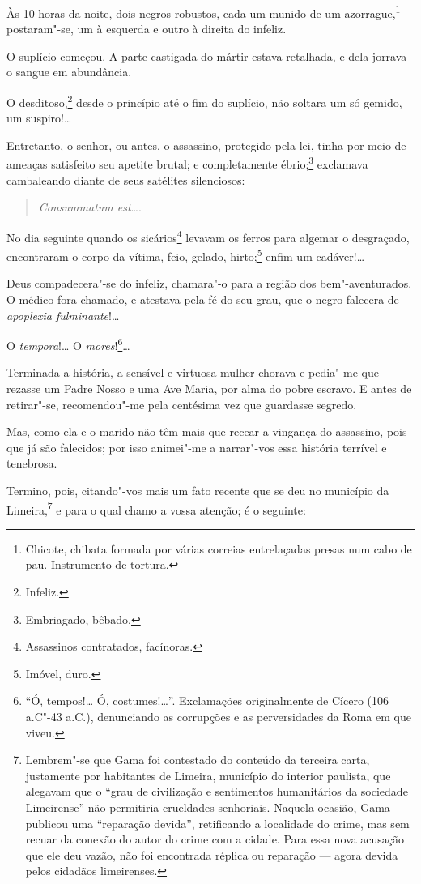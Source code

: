 Às 10 horas da noite, dois negros robustos, cada um munido de um
azorrague,\footnote{Chicote, chibata formada por várias correias
  entrelaçadas presas num cabo de pau. Instrumento de tortura.}
postaram"-se, um à esquerda e outro à direita do infeliz.

O suplício começou. A parte castigada do mártir estava retalhada, e dela
jorrava o sangue em abundância.

O desditoso,\footnote{Infeliz.} desde o princípio até o fim do
suplício, não soltara um só gemido, um suspiro!\ldots{}

Entretanto, o senhor, ou antes, o assassino, protegido pela lei, tinha
por meio de ameaças satisfeito seu apetite brutal; e completamente
ébrio;\footnote{Embriagado, bêbado.} exclamava cambaleando diante de
seus satélites silenciosos:

\begin{quote}
\emph{Consummatum est}\ldots{}.
\end{quote}

No dia seguinte quando os sicários\footnote{Assassinos contratados,
  facínoras.} levavam os ferros para algemar o desgraçado, encontraram o
corpo da vítima, feio, gelado, hirto;\footnote{Imóvel, duro.} enfim um
cadáver!\ldots{}

Deus compadecera"-se do infeliz, chamara"-o para a região dos
bem"-aventurados. O médico fora chamado, e atestava pela fé do seu grau,
que o negro falecera de \emph{apoplexia fulminante}!\ldots{}

O \emph{tempora}!\ldots{} O \emph{mores}!\footnote{``Ó, tempos!\ldots{} Ó,
  costumes!\ldots{}''. Exclamações originalmente de Cícero (106 a.C"-43 a.C.),
  denunciando as corrupções e as perversidades da Roma em que viveu.}\ldots{}

Terminada a história, a sensível e virtuosa mulher chorava e pedia"-me
que rezasse um Padre Nosso e uma Ave Maria, por alma do pobre escravo. E
antes de retirar"-se, recomendou"-me pela centésima vez que guardasse
segredo.

Mas, como ela e o marido não têm mais que recear a vingança do
assassino, pois que já são falecidos; por isso animei"-me a narrar"-vos
essa história terrível e tenebrosa.

Termino, pois, citando"-vos mais um fato recente que se deu no município
da Limeira,\footnote{Lembrem"-se que Gama foi contestado do conteúdo da
  terceira carta, justamente por habitantes de Limeira, município do
  interior paulista, que alegavam que o ``grau de civilização e
  sentimentos humanitários da sociedade Limeirense'' não permitiria
  crueldades senhoriais. Naquela ocasião, Gama publicou uma ``reparação
  devida'', retificando a localidade do crime, mas sem recuar da conexão
  do autor do crime com a cidade. Para essa nova acusação que ele deu vazão,
  não foi encontrada réplica ou reparação --- agora devida pelos
  cidadãos limeirenses.} e para o qual chamo a vossa atenção; é o
seguinte:

